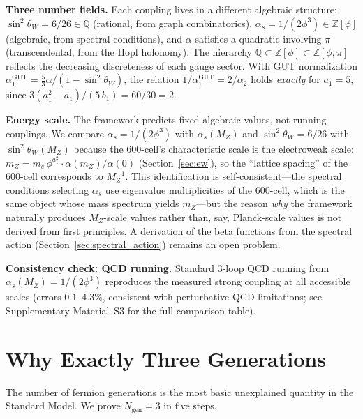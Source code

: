 \documentclass[12pt,a4paper]{article}
\theoremstyle{definition}
\begin{document}
\textbf{Three number fields.} Each coupling lives in a different algebraic structure: $\sin^2\theta_W = 6/26 \in \mathbb{Q}$ (rational, from graph combinatorics), $\alpha_s = 1/(2\phi^3) \in \mathbb{Z}[\phi]$ (algebraic, from spectral conditions), and $\alpha$ satisfies a quadratic involving $\pi$ (transcendental, from the Hopf holonomy). The hierarchy $\mathbb{Q} \subset \mathbb{Z}[\phi] \subset \mathbb{Z}[\phi, \pi]$ reflects the decreasing discreteness of each gauge sector. With GUT normalization $\alpha_1^{\text{GUT}} = \tfrac{5}{3}\alpha/(1 - \sin^2\theta_W)$, the relation $1/\alpha_1^{\text{GUT}} = 2/\alpha_2$ holds \emph{exactly} for $a_1 = 5$, since $3(a_1^2 - a_1)/(5\,b_1) = 60/30 = 2$.

\textbf{Energy scale.} The framework predicts fixed algebraic values, not running couplings. We compare $\alpha_s = 1/(2\phi^3)$ with $\alpha_s(M_Z)$ and $\sin^2\theta_W = 6/26$ with $\sin^2\theta_W(M_Z)$ because the 600-cell's characteristic scale is the electroweak scale: $m_Z = m_e\,\phi^{a_1^2} \cdot \alpha(m_Z)/\alpha(0)$ (Section~\ref{sec:ew}), so the ``lattice spacing'' of the 600-cell corresponds to $M_Z^{-1}$. This identification is self-consistent---the spectral conditions selecting $\alpha_s$ use eigenvalue multiplicities of the 600-cell, which is the same object whose mass spectrum yields $m_Z$---but the reason \emph{why} the framework naturally produces $M_Z$-scale values rather than, say, Planck-scale values is not derived from first principles. A derivation of the beta functions from the spectral action (Section~\ref{sec:spectral_action}) remains an open problem.

\textbf{Consistency check: QCD running.} Standard 3-loop QCD running from $\alpha_s(M_Z) = 1/(2\phi^3)$ reproduces the measured strong coupling at all accessible scales (errors $0.1$--$4.3\%$, consistent with perturbative QCD limitations; see Supplementary Material~S3 for the full comparison table).



\section{Why Exactly Three Generations}
\label{sec:generations}

The number of fermion generations is the most basic unexplained quantity in the Standard Model. We prove $N_{\text{gen}} = 3$ in five steps.
\end{document}
